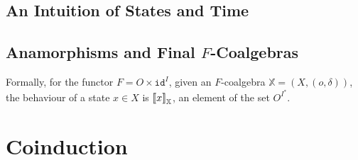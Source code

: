 %
%
%
\subsection{An Intuition of States and Time}
\subsection{Anamorphisms and Final $F$-Coalgebras}
Formally, for the functor $F=O\times \texttt{id}^I$, given an $F$-coalgebra $\mathbb{X}=(X,(o,\delta))$, the behaviour of a state $x\in X$ is ${{\llbracket x\rrbracket}}_{\mathbb{X}}$, an element of the set $O^{I^*}$. 
\subsection{}

\section{Coinduction}
